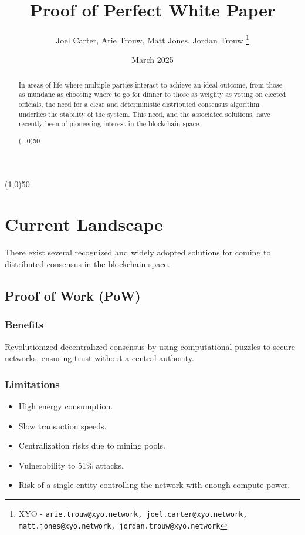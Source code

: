 \documentclass{article}
\title {Proof of Perfect White Paper}
\author{
Joel Carter,
Arie Trouw,
Matt Jones,
Jordan Trouw
\thanks{XYO - \texttt{arie.trouw@xyo.network, joel.carter@xyo.network, matt.jones@xyo.network, jordan.trouw@xyo.network}}
}
\date{March 2025}
\begin{document}
\maketitle

\begin{center}
  \line(1,0){50}
\end{center}

\begin{abstract}
  In areas of life where multiple parties interact to achieve an ideal outcome, from those as mundane as choosing where to go for dinner to those as weighty as voting on elected officials, the need for a clear and deterministic distributed consensus algorithm underlies the stability of the system. This need, and the associated solutions, have recently been of pioneering interest in the blockchain space.
  \begin{center}
    \line(1,0){50}
  \end{center}
\end{abstract}

\section{Current Landscape}
There exist several recognized and widely adopted solutions for coming to
distributed consensus in the blockchain space.

\subsection{Proof of Work (PoW)}
\subsubsection{Benefits}
Revolutionized decentralized consensus by using computational puzzles to secure
networks, ensuring trust without a central authority.
\subsubsection{Limitations}
\begin{itemize}
  \item High energy consumption.
  \item Slow transaction speeds.
  \item Centralization risks due to mining pools.
  \item Vulnerability to 51\% attacks.
  \item Risk of a single entity controlling the network with enough compute power.
\end{itemize}
\end{document}
